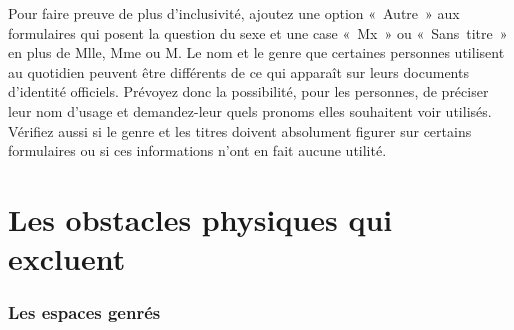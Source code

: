 \documentclass[12pt,openany]{book}
\begin{document}
Pour faire preuve de plus d’inclusivité, ajoutez une option \mbox{« Autre »} aux formulaires qui posent la question du sexe et une case \mbox{« Mx »} ou \mbox{« Sans titre »} en plus de Mlle, Mme ou M. Le nom et le genre que certaines personnes utilisent au quotidien peuvent être différents de ce qui apparaît sur leurs documents d’identité officiels. Prévoyez donc la possibilité, pour les personnes, de préciser leur nom d’usage et demandez-leur quels pronoms elles souhaitent voir utilisés. Vérifiez aussi si le genre et les titres doivent absolument figurer sur certains formulaires ou si ces informations n’ont en fait aucune utilité.

\begin{figure}[h]
    \centering
\end{figure}

\section*{Les obstacles physiques qui excluent}

\subsubsection*{Les espaces genrés}
\end{document}
